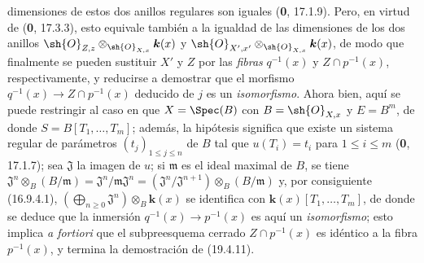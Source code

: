 
dimensiones de estos dos anillos regulares son iguales (\textbf{0}, 17.1.9). Pero, en virtud de (\textbf{0}, 17.3.3), esto equivale también a la igualdad de las dimensiones de los dos anillos $\sh{O}_{Z,z}\otimes_{\sh{O}_{X,x}}\boldsymbol{k}(x)$ y $\sh{O}_{X',x'}\otimes_{\sh{O}_{X,x}}\boldsymbol{k}(x)$, de modo que finalmente se pueden sustituir $X'$ y $Z$ por las \emph{fibras} $q^{-1}(x)$ y $Z\cap p^{-1}(x)$, respectivamente, y reducirse a demostrar que el morfismo $q^{-1}(x)\to Z\cap p^{-1}(x)$ deducido de $j$ es un \emph{isomorfismo}. Ahora bien, aquí se puede restringir al caso en que $X=\Spec(B)$ con $B=\sh{O}_{X,x}$ y $E=B^m$, de donde $S=B[T_1,\ldots,T_m]$; además, la hipótesis significa que existe un sistema regular de parámetros $(t_j)_{1\leq j\leq n}$ de $B$ tal que $u(T_i)=t_i$ para $1\leq i\leq m$ (\textbf{0}, 17.1.7); sea $\mathfrak J$ la imagen de $u$; si $\mathfrak m$ es el ideal maximal de $B$, se tiene $\mathfrak J^n\otimes_B(B/\mathfrak m)=\mathfrak J^n/\mathfrak m\mathfrak J^n=(\mathfrak J^n/\mathfrak J^{n+1})\otimes_B(B/\mathfrak m)$ y, por consiguiente (16.9.4.1), $(\bigoplus_{n\geq0}\mathfrak J^n)\otimes_B\boldsymbol{k}(x)$ se identifica con $\boldsymbol{k}(x)[T_1,\ldots,T_m]$, de donde se deduce que la inmersión $q^{-1}(x)\to p^{-1}(x)$ es aquí un \emph{isomorfismo}; esto implica \emph{a fortiori} que el subpreesquema cerrado $Z\cap p^{-1}(x)$ es idéntico a la fibra $p^{-1}(x)$, y termina la demostración de (19.4.11).
